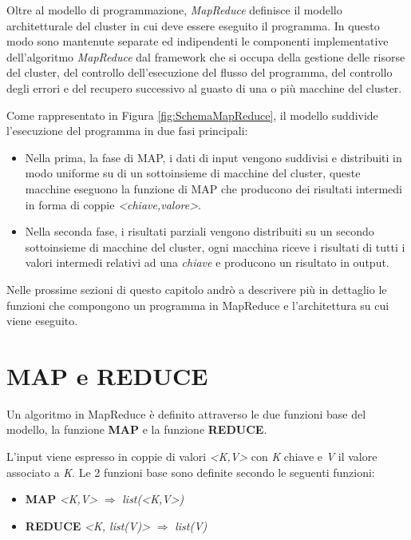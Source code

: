 \documentclass[LaM,binding=0.6cm]{sapthesis}
\begin{document}
Oltre al modello di programmazione, \textit{MapReduce} definisce il modello architetturale del cluster in cui deve essere eseguito il programma. In questo modo sono mantenute separate ed indipendenti le componenti implementative dell'algoritmo \textit{MapReduce} dal framework che si occupa della gestione delle risorse del cluster, del controllo dell'esecuzione del flusso del programma, del controllo degli errori e del recupero successivo al guasto di una o più macchine del cluster.


Come rappresentato in Figura \ref{fig:SchemaMapReduce}, il modello suddivide l'esecuzione del programma in due fasi principali: 
	\begin{itemize}
	\item Nella prima, la fase di MAP, i dati di input vengono suddivisi e distribuiti in modo uniforme su di un sottoinsieme di  macchine del cluster, queste macchine eseguono la funzione di MAP che producono dei risultati intermedi in forma di coppie \textit{<chiave,valore>}.
	\item Nella seconda fase, i risultati parziali vengono distribuiti su un secondo sottoinsieme di macchine del cluster, ogni macchina riceve i risultati di tutti i valori intermedi relativi ad una \textit{chiave} e producono un risultato in output.
	\end{itemize}
	
Nelle prossime sezioni di questo capitolo andrò a descrivere più in dettaglio le funzioni che compongono un programma in MapReduce e l'architettura su cui viene eseguito. %

\section{MAP e REDUCE}

Un algoritmo in MapReduce \cite{Dean:2008:MSD:1327452.1327492} è definito attraverso le due funzioni base del modello, la funzione \textbf{MAP} e la funzione \textbf{REDUCE}. 


L'input viene espresso in coppie  di valori \textit{<K,V>} con \textit{K} chiave e \textit{V} il valore associato a \textit{K}.	
Le 2 funzioni base sono definite secondo le seguenti funzioni:
\begin{itemize}
\item \textbf{MAP }	\textit{<K,V>} $\Rightarrow$ \textit{list(<K,V>)}
\item\textbf{REDUCE}	\textit{<K, list(V)>} $\Rightarrow$ \textit{list(V)}
\end{itemize}
\end{document}
